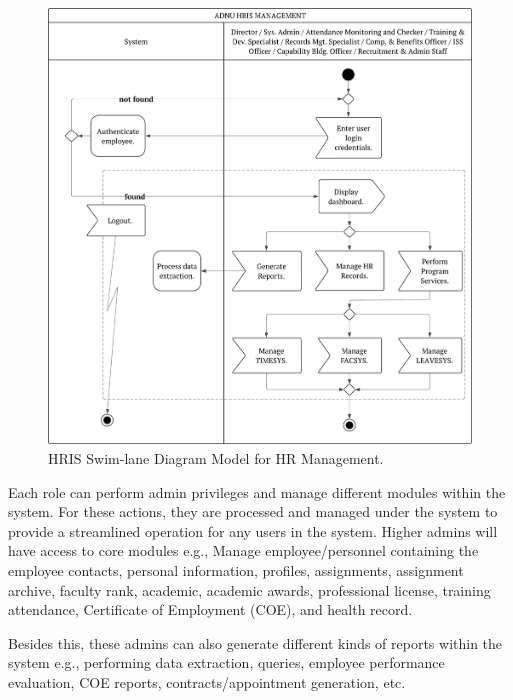     \begin{figure}[H]
        \centering
        \includegraphics[width=1\linewidth]{figures/images/diagrams/swimlane/swimlane-admins.png}
        \caption{HRIS Swim-lane Diagram Model for HR Management.}
        \label{fig:swimlane-admins}
    \end{figure}

    Each role can perform admin privileges and manage different modules within the system. For these actions, they are processed and managed under the system to provide a streamlined operation for any users in the system. Higher admins will have access to core modules e.g., Manage employee/personnel containing the employee contacts, personal information, profiles, assignments, assignment archive, faculty rank, academic, academic awards, professional license, training attendance, Certificate of Employment (COE), and health record.

    Besides this, these admins can also generate different kinds of reports within the system e.g., performing data extraction, queries, employee performance evaluation, COE reports, contracts/appointment generation, etc.

